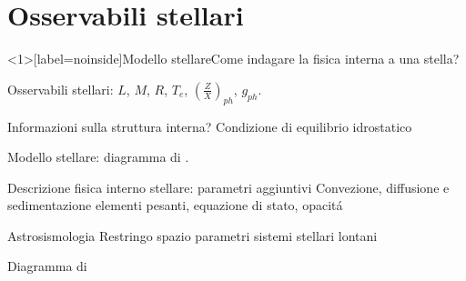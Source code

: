 \section{Osservabili stellari}

\begin{frame}<1>[label=noinside]{Modello stellare}{Come indagare la fisica interna a una stella?}

\begin{block}{Osservabili stellari:}
$L$, $M$, $R$, $T_e$, $(\frac{Z}{X})_{ph}$, $g_{ph}$.
\end{block}

\begin{block}{Informazioni sulla struttura interna?} Condizione di equilibrio idrostatico
\end{block}


\begin{block}{Modello stellare: diagramma di \hr{}.}
\end{block}

\begin{block}{Descrizione fisica interno stellare: parametri aggiuntivi}
Convezione, diffusione e sedimentazione elementi pesanti, equazione di stato, opacit\'a
\end{block}

\begin{block}{Astrosismologia}
Restringo spazio parametri sistemi stellari lontani
\end{block}

\end{frame}


{ %
    \begin{frame}[plain]{Diagramma di \hr{}}
     \end{frame}
}




